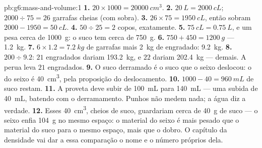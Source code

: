 \begin{solution}{pb:g6:mass-and-volume:1}
\textbf{1.} $20 \times 1000 = \qty{20000}{cm^3}$.
\textbf{2.} $\qty{20}{L} = \qty{2000}{cL}$; $2000 \div 75 = 26$
garrafas cheias (com sobra).
\textbf{3.} $26 \times 75 = \qty{1950}{cL}$, então sobram
$2000 - 1950 = \qty{50}{cL}$.
\textbf{4.} $50 \div 25 = 2$ copos, exatamente.
\textbf{5.} $\qty{75}{cL} = \qty{0.75}{L}$, e um  pesa cerca de
\qty{1000}{g}: o suco tem cerca de \qty{750}{g}.
\textbf{6.} $750 + 450 = \qty{1200}{g}$ --- \qty{1.2}{kg}.
\textbf{7.} $6 \times 1.2 = \qty{7.2}{kg}$ de garrafas mais
\qty{2}{kg} de engradado: \qty{9.2}{kg}.
\textbf{8.} $200 \div 9.2$: $21$ engradados dariam \qty{193.2}{kg},
e $22$ dariam \qty{202.4}{kg} --- demais. A perua leva $21$
engradados.
\textbf{9.} O suco derramado é o suco que o seixo deslocou: o 
do seixo é \qty{40}{cm^3}, pela proposição do deslocamento.
\textbf{10.} $1000 - 40 = \qty{960}{mL}$ de suco restam.
\textbf{11.} A proveta deve subir de \qty{100}{mL} para
\qty{140}{mL} --- uma subida de \qty{40}{mL}, batendo com o
derramamento. Punhos não medem nada; a água diz a verdade.
\textbf{12.} Esses \qty{40}{cm^3}, cheios de suco, guardariam cerca
de \qty{40}{g} de suco --- o seixo enfia \qty{104}{g} no mesmo
espaço: o material do seixo é mais pesado que o material do suco para
o mesmo espaço, mais que o dobro. O capítulo da densidade vai dar a
essa comparação o nome e o número próprios dela.
\end{solution}
